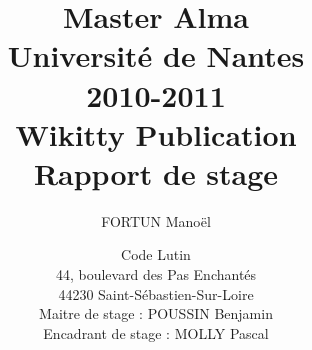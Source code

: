 \documentclass[12pt,a4paper,utf8x]{article}
\title
{
	\normalsize{Master Alma\\
	Université de Nantes\\
	2010-2011}\\
	\vspace{15mm}
	\Huge{Wikitty Publication}\\
	\normalsize{Rapport de stage}
}
\author{FORTUN Manoël\\
	\vspace{45mm}
}
\date{	
	\normalsize{Code Lutin\\
	44, boulevard des Pas Enchantés\\
	44230 Saint-Sébastien-Sur-Loire\\
	\vspace{5mm}	
	Maitre de stage : POUSSIN Benjamin \\
	Encadrant de stage : MOLLY Pascal
	}
}
\begin{document}
\maketitle

\clearpage

\newpage
\null

\newpage





\clearpage



\clearpage

\clearpage




\clearpage



\tableofcontents




\clearpage


\clearpage


\clearpage


\clearpage

\clearpage


\clearpage

\clearpage


\clearpage


\clearpage



\end{document}
